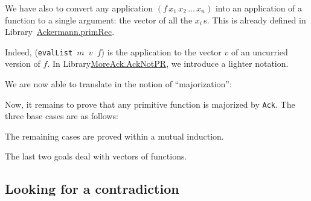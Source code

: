 




We have also to convert any application
$(f\,x_1\,x_2\,\dots\,x_n)$ into an application of a function 
to a single argument: the vector of all the $x_i$\,s.
This is already defined in 
Library~\href{../theories/html/hydras.Ackermann.primRec.html}{Ackermann.primRec}.




Indeed, (\texttt{evalList $m$ $v$ $f$}) is the application to the vector $v$ of
an uncurried version of $f$.
In Library\href{../theories/html/hydras.MoreAck.AckNotPR.html}{MoreAck.AckNotPR}, we introduce a lighter notation.






We are now able to translate in \gallina{} the notion of ``majorization'':





Now, it remains to prove that any primitive function is majorized by \texttt{Ack}.
The three base cases  are as follows:









The remaining cases are proved within a mutual  induction.









The last two goals deal with vectors of functions.




\subsection{Looking for a contradiction}


